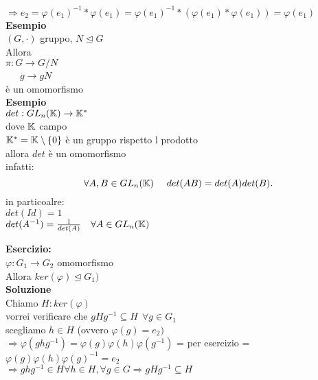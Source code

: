 \documentclass[12px]{article}
\begin{document}
   $ \Rightarrow e_2 = \varphi(e_1)^{-1}* \varphi(e_1) = \varphi(e_1)^{-1}*( \varphi(e_1)* \varphi(e_1)) = \varphi(e_1)$ \\
   \textbf{Esempio}\\
   $(G,\cdot)$ gruppo, $N\trianglelefteq G$\\
   Allora\\
   $\pi:G \rightarrow G/N$\\
   \text{} \ \ \ $g \rightarrow gN$\\
   è un omomorfismo\\
   \textbf{Esempio}\\
   $det: GL_n (\K) \rightarrow \K^*$ \\
   dove $\K$ campo\\
    $\K^* = \K \setminus \lbrace 0 \rbrace$ è un gruppo rispetto l prodotto\\
    allora  $det$ è un omomorfismo\\
    infatti:
     \[
    \forall A,B\in GL_n(\K) \ \ \ \ det(AB) = det(A)det(B)
    .\] 
    in particoalre:\\
    $det(Id) = 1$\\
    $det(A^{-1}) = \frac 1 {det(A)} \ \ \ \forall A\in GL_n(\K)$
     \begin{defi}
    	$ \varphi: G_1 \rightarrow G_2$ omomorfismo\\
	il nucleo di $ \varphi$ è $ker( \varphi) := \lbrace g\in G_1| \varphi(g) = e\rbrace$\\
	L'immagine di $\phi$ è \\
	$Im ( \varphi) = \lbrace{h\in H_2 | \exists g\in G_1: \varphi (g) = h \rbrace$
    \end{defi}
    \textbf{Esercizio:}\\
    $\varphi: G_1 \rightarrow G_2 $ omomorfismo\\
    Allora $ker( \varphi)\trianglelefteq G_1)$\\
    \textbf{Soluzione}\\
    Chiamo $H:ker ( \varphi )$\\
    vorrei verificare che $g Hg^{-1}\subseteq H \ \ \forall g\in G_1$\\
    scegliamo $h\in H$ (ovvero $ \varphi(g) = e_2)$\\
    $ \Rightarrow  \varphi(ghg^{-1}) = \varphi(g) \varphi(h) \varphi(g^{-1})$ = per esercizio = $ \varphi(g) \varphi(h) \varphi(g)^{-1} = e_2$\\
    $ \Rightarrow ghg^{-1}\in H\forall h\in H, \forall g\in G \Rightarrow gHg^{-1}\subseteq H$\\
\end{document}
